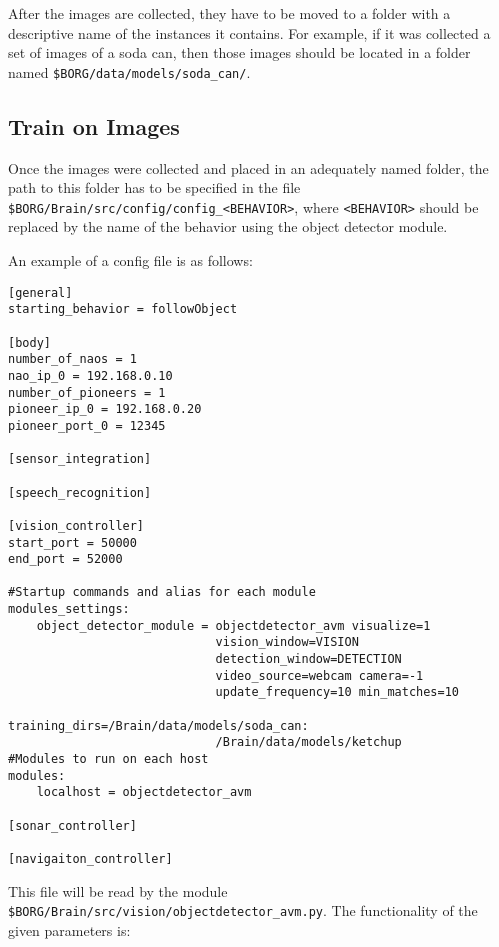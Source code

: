 \documentclass[a4paper, 12pt, oneside]{report}
\begin{document}
After the images are collected, they have to be moved to a folder with a descriptive name of the instances it contains.
For example, if it was collected a set of images of a soda can, then those images should be located in a folder named \verb=$BORG/data/models/soda_can/=.

\subsection{Train on Images}
Once the images were collected and placed in an adequately named folder, the path to this folder has to be specified in the file \verb=$BORG/Brain/src/config/config_<BEHAVIOR>=, where \verb=<BEHAVIOR>= should be replaced by the name of the behavior using the object detector module.

An example of a config file is as follows:

\begin{verbatim}
[general]
starting_behavior = followObject

[body]
number_of_naos = 1
nao_ip_0 = 192.168.0.10
number_of_pioneers = 1
pioneer_ip_0 = 192.168.0.20
pioneer_port_0 = 12345

[sensor_integration]

[speech_recognition]

[vision_controller]
start_port = 50000
end_port = 52000

#Startup commands and alias for each module
modules_settings:
    object_detector_module = objectdetector_avm visualize=1
                             vision_window=VISION
                             detection_window=DETECTION
                             video_source=webcam camera=-1
                             update_frequency=10 min_matches=10
                             training_dirs=/Brain/data/models/soda_can:
                             /Brain/data/models/ketchup
#Modules to run on each host
modules:
    localhost = objectdetector_avm

[sonar_controller]

[navigaiton_controller]
\end{verbatim}

This file will be read by the module \verb=$BORG/Brain/src/vision/objectdetector_avm.py=. The functionality of the given parameters is:
\end{document}
